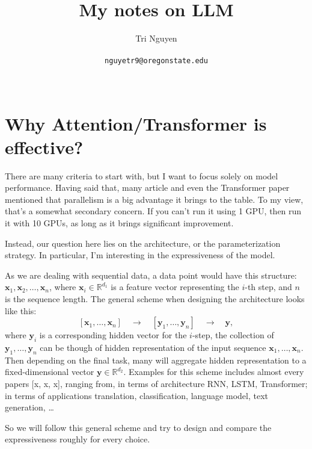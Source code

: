 \documentclass[11pt,a4paper]{article}
\title{My notes on LLM}
\author{	Tri Nguyen \\\\
        \texttt{nguyetr9@oregonstate.edu} \\\\
        }
\begin{document}
\maketitle
\section{Why Attention/Transformer is effective?}%
\label{sec:why_attention_transformer_is_effective_}
There are many criteria to start with, but I want to focus solely on model performance. Having said that, many article and even the Transformer paper \cite{vaswani2017attention} mentioned that parallelism is a big advantage it brings to the table. To my view, that's a somewhat secondary concern. If you can't run it using 1 GPU, then run it with 10 GPUs, as long as it brings significant improvement.

Instead, our question here lies on the architecture, or the parameterization strategy. In particular, I'm interesting in the expressiveness of the model.

As we are dealing with sequential data, a data point would have this structure: $\bm{x}_1, \bm{x}_2, \ldots , \bm{x}_n$, where $\bm{x}_i \in \mathbb{R}^{d_1}$ is a feature vector representing the $i$-th step, and $n$ is the sequence length. The general scheme when designing the architecture looks like this:
\[
[\bm{x}_1, \ldots , \bm{x}_n] 
\quad \to \quad 
[\bm{y}_1, \ldots , \bm{y}_n]
\quad \to \quad 
\bm{y},
\] 
where $\bm{y}_i$ is a corresponding hidden vector for the $i$-step, the collection of $\bm{y}_1, \ldots , \bm{y}_n$ can be though of hidden representation of the input sequence $\bm{x}_1, \ldots , \bm{x}_n$. Then depending on the final task, many will aggregate hidden representation to a fixed-dimensional vector 
$\bm{y} \in \mathbb{R}^{d_2}$.
Examples for this scheme includes almost every papers [x, x, x], ranging from, in terms of architecture RNN, LSTM, Transformer; in terms of applications translation, classification, language model, text generation, \ldots 

So we will follow this general scheme and try to design and compare the expressiveness roughly for every choice.
\end{document}
